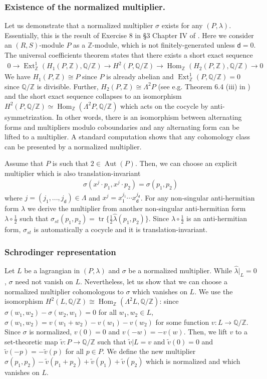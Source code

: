 \documentclass[sn-mathphys-num]{sn-jnl}
\theoremstyle{definition}
\numberwithin{equation}{section}
\theoremstyle{definition}
\def\IQ{\mathbb{Q}}
\def\IZ{{\mathbb{Z}}}
\def\l{{\lambda}}
\def\hl{{\hat \lambda}}
\def\Hom{\operatorname{Hom}}
\def\ext{\operatorname{Ext}}
\def\tr{\operatorname{tr}}
\newcommand{\dd}{{\mathsf{d}}} %
\begin{document}
\subsubsection{Existence of the normalized multiplier.} Let us demonstrate that a normalized multiplier $\sigma$ exists for any $(P,\l)$. Essentially, this is the result of Exercise 8 in \S 3 Chapter IV of \cite{brown1982cohomology}. Here we consider an $(R,S)$-module $P$ as a $\IZ$-module, which is not finitely-generated unless $\dd=0$. The universal coefficients theorem states that there exists a short exact sequence
\begin{align}
    0\rightarrow\ext^1_{\IZ}(H_1(P,\IZ),\IQ/\IZ)\rightarrow H^2(P,\IQ/\IZ)\rightarrow \Hom_{\IZ}(H_2(P,\IZ),\IQ/\IZ)\rightarrow 0
\end{align}
We have $H_1(P,\IZ)\cong P$ since $P$ is already abelian and $\ext^1_{\IZ}(P,\IQ/\IZ)=0$ since $\IQ/\IZ$ is divisible. Further, $H_2(P,\IZ)\cong \Lambda^2P$ (see e.g. Theorem 6.4 (iii) in \cite{brown1982cohomology}) and the short exact sequence collapses to an isomorphism $H^2(P,\IQ/\IZ)\simeq \Hom_{\IZ}(\Lambda^2P,\IQ/\IZ)$ which acts on the cocycle by anti-symmetrization. In other words, there is an isomorphism between alternating forms and multipliers modulo coboundaries and any alternating form can be lifted to a multiplier. A standard computation shows that any cohomology class can be presented by a normalized multiplier. 

Assume that $P$ is such that $2\in \operatorname{Aut}(P)$. Then, we can choose an explicit multiplier which is also translation-invariant 
\begin{align}
    \sigma(x^j\cdot p_1,x^j\cdot p_2)=\sigma(p_1,p_2)
\end{align} where $j=(j_1,...,j_\dd)\in \Lambda$ and $x^j=x_1^{j_1}\cdots x_\dd^{j_\dd}$. For any non-singular anti-hermitian form $\l$ we derive the multiplier from another non-singular anti-hermitian form $\l\circ \frac{1}{2}$ such that $\sigma_{st}(p_1,p_2)=\tr\{\frac{1}{2}\hl(p_1,p_2)\}$. Since $\l\circ \frac{1}{2}$ is an anti-hermitian form, $\sigma_{st}$ is automatically a cocycle and it is translation-invariant. 

\subsubsection{Schrodinger representation}
Let $L$ be a lagrangian in $(P,\l)$ and $\sigma$ be a normalized multiplier. While $\hl|_{L}=0$, $\sigma$ need not vanish on $L$. Nevertheless, let us show that we can choose a normalized multiplier cohomologous to $\sigma$ which vanishes on $L$. We use the isomorphism $H^2(L,\IQ/\IZ)\cong \Hom_{\IZ}(\Lambda^2 L,\IQ/\IZ)$: since $\sigma(w_1,w_2)-\sigma(w_2,w_1)=0$ for all $w_1,w_2\in L$, $\sigma(w_1,w_2)=v(w_1+w_2)-v(w_1)-v(w_2)$ for some function $v:L\to \IQ/\IZ$. Since $\sigma$ is normalized, $v(0)=0$ and $v(-w)=-v(w)$. Then, we lift $v$ to a set-theoretic map $\tilde v:P\to \IQ/\IZ$ such that $\tilde v|L=v$ and $\tilde v(0)=0$ and $\tilde v(-p)=-\tilde v(p)$ for all $p\in P$. We define the new multiplier $\sigma(p_1,p_2)-\tilde v(p_1+p_2)+\tilde v(p_1)+\tilde v(p_2)$ which is normalized and which vanishes on $L$.
\end{document}
